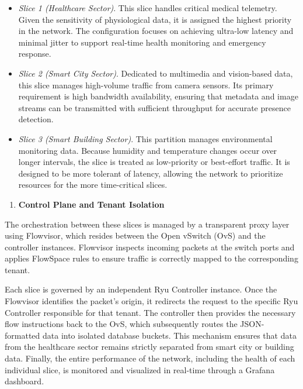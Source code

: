 \begin{itemize}
\item
  \emph{Slice 1 (Healthcare Sector)}. This slice handles critical medical telemetry. Given the sensitivity of physiological data, it is assigned the highest priority in the network. The configuration focuses on achieving ultra-low latency and minimal jitter to support real-time health monitoring and emergency response.
\item
  \emph{Slice 2 (Smart City Sector)}. Dedicated to multimedia and vision-based data, this slice manages high-volume traffic from camera sensors. Its primary requirement is high bandwidth availability, ensuring that metadata and image streams can be transmitted with sufficient throughput for accurate presence detection.
\item
  \emph{Slice 3 (Smart Building Sector)}. This partition manages environmental monitoring data. Because humidity and temperature changes occur over longer intervals, the slice is treated as low-priority or best-effort traffic. It is designed to be more tolerant of latency, allowing the network to prioritize resources for the more time-critical slices.
\end{itemize}

\begin{enumerate}
\def\labelenumi{\arabic{enumi})}
\setcounter{enumi}{2}
\item
  \textbf{Control Plane and Tenant Isolation}
\end{enumerate}

The orchestration between these slices is managed by a transparent proxy layer using Flowvisor, which resides between the Open vSwitch (OvS) and the controller instances. Flowvisor inspects incoming packets at the switch ports and applies FlowSpace rules to ensure traffic is correctly mapped to the corresponding tenant.

Each slice is governed by an independent Ryu Controller instance. Once the Flowvisor identifies the packet's origin, it redirects the request to the specific Ryu Controller responsible for that tenant. The controller then provides the necessary flow instructions back to the OvS, which subsequently routes the JSON-formatted data into isolated database buckets. This mechanism ensures that data from the healthcare sector remains strictly separated from smart city or building data. Finally, the entire performance of the network, including the health of each individual slice, is monitored and visualized in real-time through a Grafana dashboard.

